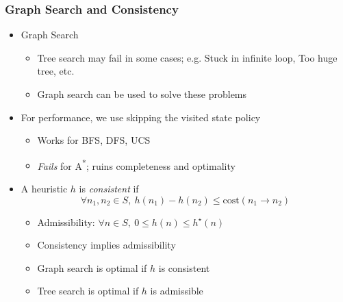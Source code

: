 \subsubsection*{Graph Search and Consistency}
\begin{itemize}
    \item Graph Search
    \begin{itemize}
        \item Tree search may fail in some cases; e.g. Stuck in infinite loop, Too huge tree, etc.
        \item Graph search can be used to solve these problems
    \end{itemize}
    \item For performance, we use skipping the visited state policy
    \begin{itemize}
        \item Works for BFS, DFS, UCS
        \item \textit{Fails} for A\textsuperscript{*}; ruins completeness and optimality
    \end{itemize}
    \item A heuristic $h$ is \textit{consistent} if
    \begin{equation}
        \forall n_1,n_2\in S,~h(n_1)-h(n_2)\leq\text{cost}(n_1\to n_2)
    \end{equation}
    \begin{itemize}
        \item Admissibility: $\forall n\in S,~0\leq h(n)\leq h^\star(n)$
        \item Consistency implies admissibility
        \item Graph search is optimal if $h$ is consistent
        \item Tree search is optimal if $h$ is admissible
    \end{itemize}
\end{itemize}
